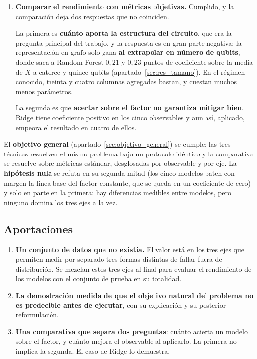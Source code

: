 \begin{enumerate}
    \item \textbf{Comparar el rendimiento con métricas objetivas.} Cumplido, y la comparación
          deja dos respuestas que no coinciden.

          La primera es \textbf{cuánto aporta la estructura del circuito}, que era la pregunta principal del trabajo, y la respuesta es en gran parte negativa: la representación en
          grafo solo gana \textbf{al extrapolar en número de qubits}, donde saca a Random Forest
          $0{,}21$ y $0{,}23$ puntos de coeficiente sobre la media de $X$ a catorce y quince
          qubits (apartado~\ref{sec:res_tamano}). En el régimen conocido, treinta y cuatro
          columnas agregadas bastan, y cuestan muchos menos parámetros.

          La segunda es que \textbf{acertar sobre el factor no garantiza mitigar bien}. Ridge
          tiene coeficiente positivo en los cinco observables y aun así, aplicado, empeora el
          resultado en cuatro de ellos.

\end{enumerate}

El \textbf{objetivo general} (apartado~\ref{sec:objetivo_general}) se cumple: las tres técnicas
resuelven el mismo problema bajo un protocolo idéntico y la comparativa se resuelve sobre
métricas estándar, desglosadas por observable y por eje. La \textbf{hipótesis nula} se refuta en
su segunda mitad (los cinco modelos baten con margen la línea base del factor constante, que
se queda en un coeficiente de cero) y solo en parte en la primera: hay diferencias medibles
entre modelos, pero ninguno domina los tres ejes a la vez.

\subsection*{Aportaciones}

\begin{enumerate}
    \item \textbf{Un conjunto de datos que no existía.} El valor está en los tres ejes que permiten medir por separado tres formas distintas de fallar fuera
          de distribución. Se mezclan estos tres ejes al final para evaluar el rendimiento de los modelos con el conjunto de prueba en su totalidad.

    \item \textbf{La demostración medida de que el objetivo natural del problema no es
          predecible antes de ejecutar}, con su explicación y su posterior reformulación.

    \item \textbf{Una comparativa que separa dos preguntas}: cuánto
          acierta un modelo sobre el factor, y cuánto mejora el observable al aplicarlo. La primera no implica la segunda. El caso de
          Ridge lo demuestra.
\end{enumerate}

